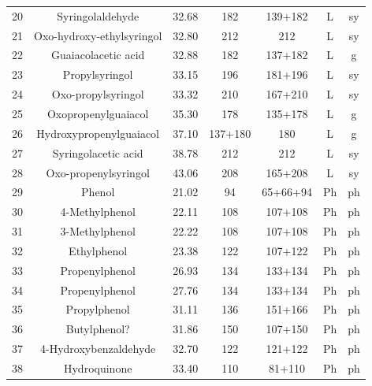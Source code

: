 \documentclass[preprint,review,12pt]{elsarticle}
\begin{document}
\begin{table}[h!]
\begin{center}
{\begin{tabular}{ccccccc}
  20 & Syringolaldehyde & 32.68 & 182 & 139+182 & L & sy \\ 
  21 & Oxo-hydroxy-ethylsyringol & 32.80 & 212 & 212 & L & sy \\ 
  22 & Guaiacolacetic acid & 32.88 & 182 & 137+182 & L & g \\ 
  23 & Propylsyringol & 33.15 & 196 & 181+196 & L & sy \\ 
  24 & Oxo-propylsyringol & 33.32 & 210 & 167+210 & L & sy \\ 
  25 & Oxopropenylguaiacol & 35.30 & 178 & 135+178 & L & g \\ 
  26 & Hydroxypropenylguaiacol & 37.10 & 137+180 & 180 & L & g \\ 
  27 & Syringolacetic acid & 38.78 & 212 & 212 & L & sy \\ 
  28 & Oxo-propenylsyringol & 43.06 & 208 & 165+208 & L & sy \\ 
  29 & Phenol & 21.02 & 94 & 65+66+94 & Ph & ph \\ 
  30 & 4-Methylphenol & 22.11 & 108 & 107+108 & Ph & ph \\ 
  31 & 3-Methylphenol & 22.22 & 108 & 107+108 & Ph & ph \\ 
  32 & Ethylphenol & 23.38 & 122 & 107+122 & Ph & ph \\ 
  33 & Propenylphenol & 26.93 & 134 & 133+134 & Ph & ph \\ 
  34 & Propenylphenol & 27.76 & 134 & 133+134 & Ph & ph \\ 
  35 & Propylphenol & 31.11 & 136 & 151+166 & Ph & ph \\ 
  36 & Butylphenol? & 31.86 & 150 & 107+150 & Ph & ph \\ 
  37 & 4-Hydroxybenzaldehyde & 32.70 & 122 & 121+122 & Ph & ph \\ 
  38 & Hydroquinone & 33.40 & 110 & 81+110 & Ph & ph \\ 
   \hline
\end{tabular}
}
\end{center}
\end{table}
\newpage
\end{document}
